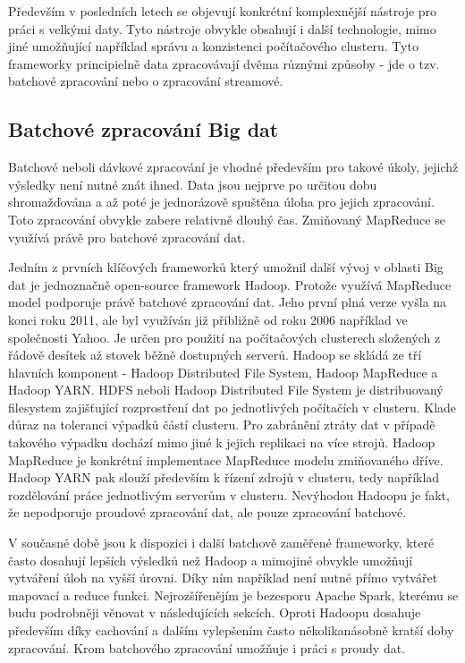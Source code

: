 \documentclass[thesis=B,czech]{FITthesis}[2012/06/26]
\begin{document}
	Především v posledních letech se objevují konkrétní komplexnější nástroje pro práci s velkými daty. Tyto nástroje obvykle obsahují i další technologie, mimo jiné umožňující například správu a konzistenci počítačového clusteru. Tyto frameworky principielně data zpracovávají dvěma různými způsoby - jde o tzv. batchové zpracování nebo o zpracování streamové. 
	
\subsection{Batchové zpracování Big dat}
	Batchové neboli dávkové zpracování je vhodné především pro takové úkoly, jejichž výsledky není nutné znát ihned. Data jsou nejprve po určitou dobu shromažďována a až poté je jednorázově spuštěna úloha pro jejich zpracování. Toto zpracování obvykle zabere relativně dlouhý čas. Zmiňovaný MapReduce se využívá právě pro batchové zpracování dat. 

	Jedním z prvních klíčových frameworků který umožnil další vývoj v oblasti Big dat je jednoznačně open-source framework Hadoop\cite{hadoop-home}. Protože využívá MapReduce model podporuje právě batchové zpracování dat. Jeho první plná verze vyšla na konci roku 2011, ale byl využíván již přibližně od roku 2006 například ve společnosti Yahoo\cite{hadoop-history}. Je určen pro použití na počítačových clusterech složených z řádově desítek až stovek běžně dostupných serverů. Hadoop se skládá ze tří hlavních komponent - Hadoop Distributed File System, Hadoop MapReduce a Hadoop YARN. HDFS neboli Hadoop Distributed File System je distribuovaný filesystem zajišťující rozprostření dat po jednotlivých počítačích v clusteru. Klade důraz na toleranci výpadků částí clusteru. Pro zabránění ztráty dat v případě takového výpadku dochází mimo jiné k jejich replikaci na více strojů. Hadoop MapReduce je konkrétní implementace MapReduce modelu zmiňovaného dříve. Hadoop YARN pak slouží především k řízení zdrojů v clusteru, tedy například rozdělování práce jednotlivým serverům v clusteru. Nevýhodou Hadoopu je fakt, že nepodporuje proudové zpracování dat, ale pouze zpracování batchové. 
	
	V současné době jsou k dispozici i další batchově zaměřené frameworky, které často dosahují lepších výsledků než Hadoop a mimojiné obvykle umožňují vytváření úloh na vyšší úrovni. Díky ním například není nutné přímo vytvářet mapovací a reduce funkci. Nejrozšířenějím je bezesporu Apache Spark\cite{spark-home}, kterému se budu podrobněji věnovat v následujících sekcích. Oproti Hadoopu dosahuje především díky cachování a dalším vylepšením často několikanásobně kratší doby zpracování. Krom batchového zpracování umožňuje i práci s proudy dat. 
\end{document}
